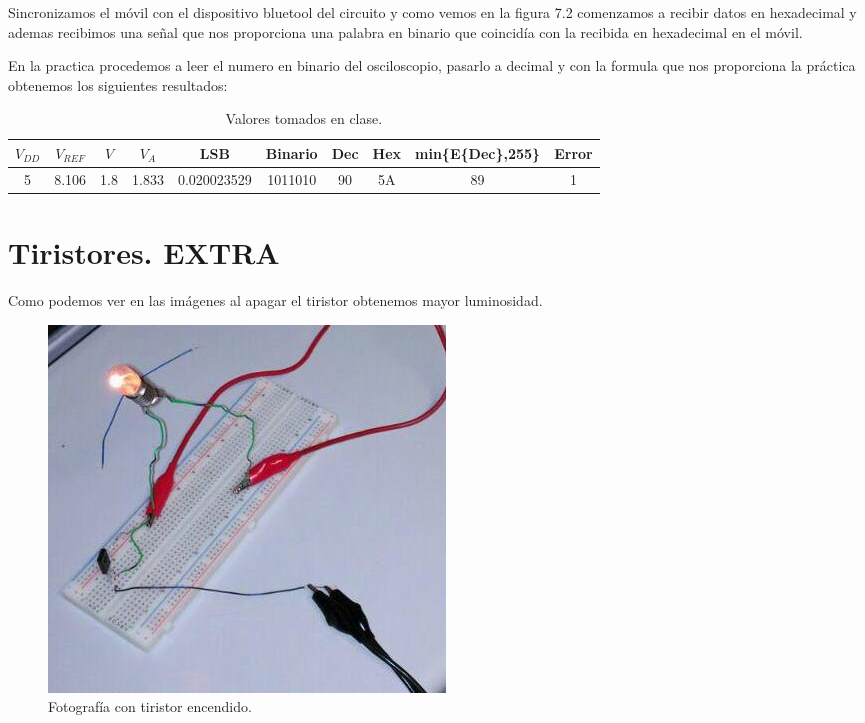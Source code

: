 \documentclass[paper=a4, fontsize=11pt]{scrartcl} %
\numberwithin{equation}{section} %
\numberwithin{figure}{section} %
\numberwithin{table}{section} %
\begin{document}
Sincronizamos el móvil con el dispositivo bluetool del circuito y como vemos en la figura 7.2 comenzamos a recibir datos en hexadecimal y ademas recibimos una señal que nos proporciona una palabra en binario que coincidía con la recibida en hexadecimal en el móvil. \newline

En la practica procedemos a leer el numero en binario del osciloscopio, pasarlo a decimal y con la formula que nos proporciona la práctica obtenemos los siguientes resultados: \newline

\begin{table}[H]
	\centering
	\begin{tabular}{|c|c|c|c|c|c|c|c|c|c|}
		\hline
		\textbf{$ V_{DD} $} & \textbf{$ V_{REF} $} & \textbf{$ V $} & \textbf{$ V_{A} $ } & \textbf{LSB} &  \textbf{Binario} & \textbf{Dec} & \textbf{Hex} & \textbf{min\{E\{Dec\},255\}} & Error \\
		\hline
		5 & 8.106 & 1.8 & 1.833 & 0.020023529 & 1011010 & 90 & 5A & 89 & 1 \\
		\hline
	\end{tabular}
	\caption{Valores tomados en clase.} \label{medidas}
\end{table}

\newpage

\section{Tiristores. EXTRA}

Como podemos ver en las imágenes al apagar el tiristor obtenemos mayor luminosidad. \newline


\begin{figure}[H]
	\centering
	\includegraphics[scale=0.7]{image/practica1-bombillaA}
	\caption{Fotografía con tiristor encendido.} \label{Color-resistencia}
\end{figure}
\end{document}
